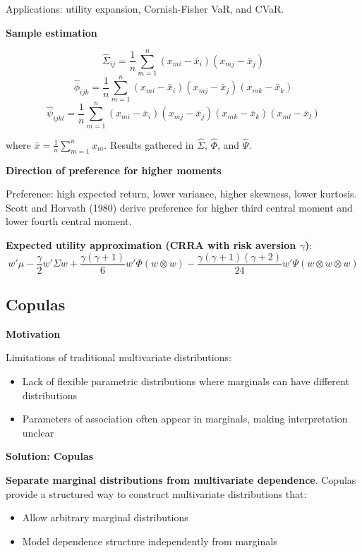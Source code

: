 \documentclass[12pt,a4paper]{article}
\begin{document}
Applications: utility expansion, Cornish-Fisher VaR, and CVaR.

\vspace{0.5em}

\textbf{Sample estimation}

\[
\hat{\Sigma}_{ij} = \frac{1}{n}\sum_{m=1}^n (x_{mi} - \bar{x}_i)(x_{mj} - \bar{x}_j)
\]
\[
\hat{\phi}_{ijk} = \frac{1}{n}\sum_{m=1}^n (x_{mi} - \bar{x}_i)(x_{mj} - \bar{x}_j)(x_{mk} - \bar{x}_k)
\]
\[
\hat{\psi}_{ijkl} = \frac{1}{n}\sum_{m=1}^n (x_{mi} - \bar{x}_i)(x_{mj} - \bar{x}_j)(x_{mk} - \bar{x}_k)(x_{ml} - \bar{x}_l)
\]

where $\bar{x} = \frac{1}{n}\sum_{m=1}^n x_m$. Results gathered in $\hat{\Sigma}$, $\hat{\Phi}$, and $\hat{\Psi}$.

\vspace{0.5em}

\textbf{Direction of preference for higher moments}

Preference: high expected return, lower variance, higher skewness, lower kurtosis. Scott and Horvath (1980) derive preference for higher third central moment and lower fourth central moment.

\textbf{Expected utility approximation (CRRA with risk aversion $\gamma$)}:
\[
w'\mu - \frac{\gamma}{2}w'\Sigma w + \frac{\gamma(\gamma+1)}{6}w'\Phi(w \otimes w) - \frac{\gamma(\gamma+1)(\gamma+2)}{24}w'\Psi(w \otimes w \otimes w)
\]

\subsection{Copulas}

\textbf{Motivation}

Limitations of traditional multivariate distributions:

\begin{itemize}
    \item Lack of flexible parametric distributions where marginals can have different distributions
    \item Parameters of association often appear in marginals, making interpretation unclear
\end{itemize}

\textbf{Solution: Copulas}

\textbf{Separate marginal distributions from multivariate dependence}. Copulas provide a structured way to construct multivariate distributions that:

\begin{itemize}
    \item Allow arbitrary marginal distributions
    \item Model dependence structure independently from marginals
\end{itemize}
\end{document}
